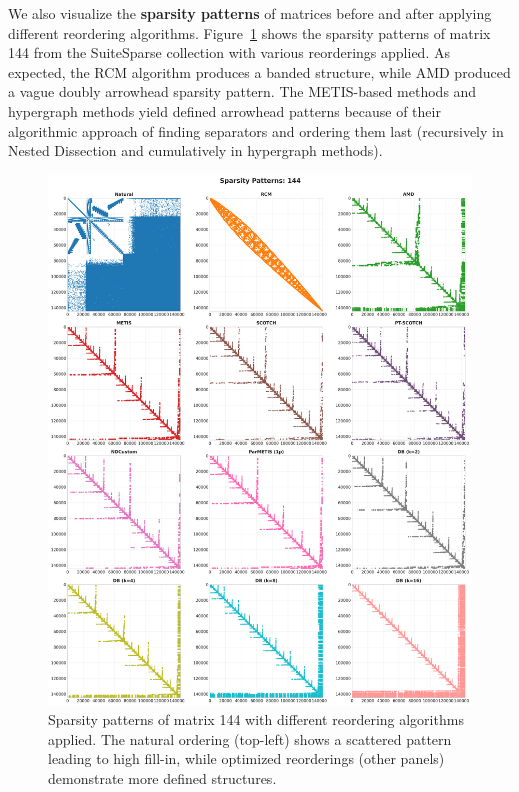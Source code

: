 We also visualize the \textbf{sparsity patterns} of matrices before and after applying different reordering algorithms. Figure~\ref{fig:144-sparsity-patterns} shows the sparsity patterns of matrix 144 from the SuiteSparse collection with various reorderings applied. As expected, the RCM algorithm produces a banded structure, while AMD produced a vague doubly arrowhead sparsity pattern. The METIS-based methods and hypergraph methods yield defined arrowhead patterns because of their algorithmic approach of finding separators and ordering them last (recursively in Nested Dissection and cumulatively in hypergraph methods).

\begin{figure}[h]
\centering
\includegraphics[width=\textwidth]{fig/res/144_sparsity_patterns.png}
\caption{Sparsity patterns of matrix 144 with different reordering algorithms applied. The natural ordering (top-left) shows a scattered pattern leading to high fill-in, while optimized reorderings (other panels) demonstrate more defined structures.}
\label{fig:144-sparsity-patterns}
\end{figure}

